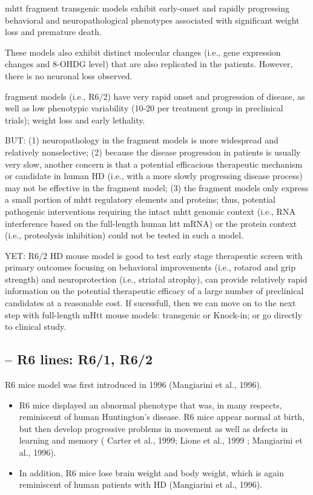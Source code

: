 mhtt fragment transgenic models exhibit early-onset and rapidly progressing
behavioral and neuropathological phenotypes associated with significant weight
loss and premature death.

These models also exhibit distinct molecular changes (i.e., gene expression
changes and 8-OHDG level) that are also replicated in the patients. However,
there is no neuronal loss observed.

\begin{mdframed}

fragment models (i.e., R6/2) have very rapid onset and progression of disease,
as well as low phenotypic variability (10-20 per treatment group in preclinical
trials); weight loss and early lethality. 

BUT: (1) neuropathology in the fragment models is more widespread and relatively
nonselective; (2) because the disease progression in patients is usually very
slow, another concern is that a potential efficacious therapeutic mechanism or
candidate in human HD (i.e., with a more slowly progressing disease process) may
not be effective in the fragment model; (3) the fragment models only express a
small portion of mhtt regulatory elements and proteins; thus, potential
pathogenic interventions requiring the intact mhtt genomic context (i.e., RNA
interference based on the full-length human htt mRNA) or the protein context
(i.e., proteolysis inhibition) could not be tested in such a model.

YET: R6/2 HD mouse model is good to test early stage therapeutic screen with
primary outcomes focusing on behavioral improvements (i.e., rotarod and grip
strength) and neuroprotection (i.e., striatal atrophy), can provide relatively
rapid information on the potential therapeutic efficacy of a large number of
preclinical candidates at a reasonable cost.
If sucessfull, then we can move on to the next step with full-length mHtt mouse
models: transgenic or Knock-in; or go directly to clinical study.


\end{mdframed}
\subsection{-- R6 lines: R6/1, R6/2}

R6 mice model was first introduced in 1996 (Mangiarini et al., 1996).
\begin{itemize}
  \item  R6 mice displayed an abnormal phenotype that was, in many respects,
  reminiscent of human Huntington's disease. R6 mice appear normal at birth, but then develop
progressive problems in movement as well as defects in learning and memory (
Carter et al., 1999; Lione et al., 1999 ;  Mangiarini et al., 1996).  
  \item In addition, R6 mice lose brain weight and body weight, which is again
reminiscent of human patients with HD (Mangiarini et al., 1996).
\end{itemize}

